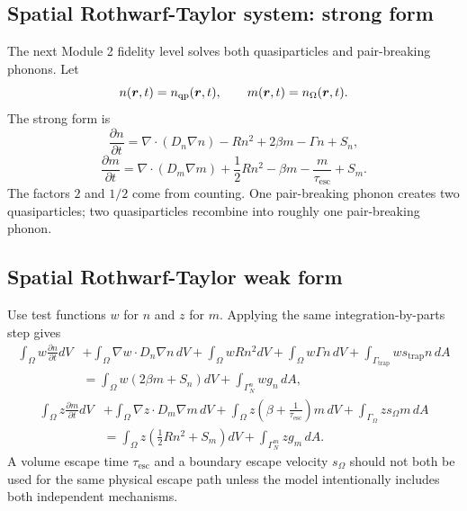 \documentclass[11pt]{article}
\newcommand{\br}{{\bm{r}}}
\newcommand{\esc}{\mathrm{esc}}
\newcommand{\trap}{\mathrm{trap}}
\begin{document}
\subsection{Spatial Rothwarf-Taylor system: strong form}
The next Module 2 fidelity level solves both quasiparticles and pair-breaking phonons. Let
\begin{equation}
 n(\br,t)=n_{\qp}(\br,t),\qquad m(\br,t)=n_{\Omega}(\br,t).
\end{equation}
The strong form is
\begin{equation}
\frac{\partial n}{\partial t}
=\nabla\cdot(D_n\nabla n)-Rn^2+2\beta m-\Gamma n+S_n,
\label{eq:fem_rt_strong_n}
\end{equation}
\begin{equation}
\frac{\partial m}{\partial t}
=\nabla\cdot(D_m\nabla m)+\frac{1}{2}Rn^2-\beta m-\frac{m}{\tau_{\esc}}+S_m.
\label{eq:fem_rt_strong_m}
\end{equation}
The factors $2$ and $1/2$ come from counting. One pair-breaking phonon creates two quasiparticles; two quasiparticles recombine into roughly one pair-breaking phonon.

\subsection{Spatial Rothwarf-Taylor weak form}
Use test functions $w$ for $n$ and $z$ for $m$. Applying the same integration-by-parts step gives
\begin{align}
\int_{\Omega}w\frac{\partial n}{\partial t}dV
&+\int_{\Omega}\nabla w\cdot D_n\nabla n\,dV
+\int_{\Omega}wRn^2dV
+\int_{\Omega}w\Gamma n\,dV
+\int_{\Gamma_{\trap}}ws_{\trap}n\,dA \nonumber\\
&=\int_{\Omega}w(2\beta m+S_n)dV
+\int_{\Gamma_N^n}w g_n\,dA,
\label{eq:fem_rt_weak_n}
\end{align}
\begin{align}
\int_{\Omega}z\frac{\partial m}{\partial t}dV
&+\int_{\Omega}\nabla z\cdot D_m\nabla m\,dV
+\int_{\Omega}z\left(\beta+\frac{1}{\tau_{\esc}}\right)m\,dV
+\int_{\Gamma_{\Omega}}z s_{\Omega}m\,dA \nonumber\\
&=\int_{\Omega}z\left(\frac{1}{2}Rn^2+S_m\right)dV
+\int_{\Gamma_N^m}z g_m\,dA.
\label{eq:fem_rt_weak_m}
\end{align}
A volume escape time $\tau_{\esc}$ and a boundary escape velocity $s_{\Omega}$ should not both be used for the same physical escape path unless the model intentionally includes both independent mechanisms.
\end{document}
